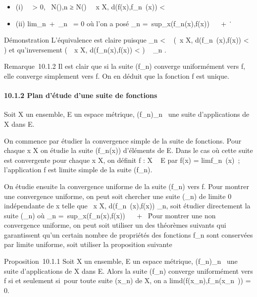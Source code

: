 \documentclass[]{article}
\begin{document}
\begin{itemize}
\itemsep1pt\parskip0pt
\item
  (i) \forall~~\epsilon > 0,
  \exists~N(\epsilon),\quad n ≥ N(\epsilon)
  \rigtharrow~\forall~x \in X, d(f(x),f_n~(x)) <
  \epsilon
\item
  (ii) lim_n\rightarrow~+\infty~\mu_n~ = 0 où
  l'on a posé \mu_n =\
  sup_x\inXd(f_n(x),f(x)) \in {}~ \cup\ +
  \infty~\.
\end{itemize}

Démonstration L'équivalence est claire puisque \mu_n <
\epsilon \rigtharrow~ (\forall~x \in X, d(f_n~(x),f(x))
< \epsilon) et qu'inversement (\forall~~x \in X,
d(f_n(x),f(x)) < \epsilon) \rigtharrow~ \mu_n \leq \epsilon.

Remarque~10.1.2 Il est clair que si la suite (f_n) converge
uniformément vers f, elle converge simplement vers f. On en déduit que
la fonction f est unique.

\paragraph{10.1.2 Plan d'étude d'une suite de fonctions}

Soit X un ensemble, E un espace métrique, (f_n)_n\in{}~
une suite d'applications de X dans E.

On commence par étudier la convergence simple de la suite de fonctions.
Pour chaque x \in X on étudie la suite (f_n(x)) d'éléments de E.
Dans le cas où cette suite est convergente pour chaque x \in X, on définit
f : X \rightarrow~ E par f(x) = limf_n~(x)~;
l'application f est limite simple de la suite (f_n).

On étudie ensuite la convergence uniforme de la suite (f_n)
vers f. Pour montrer une convergence uniforme, on peut soit chercher une
suite (\alpha_n) de limite 0 indépendante de x telle que
\forall~x \in X, d(f_n~(x),f(x)) \leq
\alpha_n, soit étudier directement la suite (\mu_n) où
\mu_n =\
sup_x\inXd(f_n(x),f(x)) \in {}~ \cup\ +
\infty~\. Pour montrer une non convergence uniforme, on peut
soit utiliser un des théorèmes suivants qui garantissent qu'un certain
nombre de propriétés des fonctions f_n sont conservées par
limite uniforme, soit utiliser la proposition suivante

Proposition~10.1.1 Soit X un ensemble, E un espace métrique,
(f_n)_n\in{}~ une suite d'applications de X dans E. Alors
la suite (f_n) converge uniformément vers f si et seulement
si~pour toute suite (x_n) de X, on a
limd(f(x_n),f_n(x_n~))
= 0.
\end{document}
